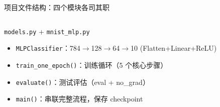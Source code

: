 \documentclass[aspectratio=169]{ctexbeamer}
\begin{document}
\begin{frame}[shrink=15]{项目文件结构：四个模块各司其职}
\begin{columns}[T]
\footnotesize
\begin{block}{\texttt{models.py} + \texttt{mnist\_mlp.py}}
\begin{itemize}
  \item \texttt{MLPClassifier}：784$\to$128$\to$64$\to$10 (Flatten+Linear+ReLU)
  \item \texttt{train\_one\_epoch()}：训练循环（5 个核心步骤）
  \item \texttt{evaluate()}：测试评估（eval + no\_grad）
  \item \texttt{main()}：串联完整流程，保存 checkpoint
\end{itemize}
\end{block}
\end{columns}
\end{frame}

\end{document}
